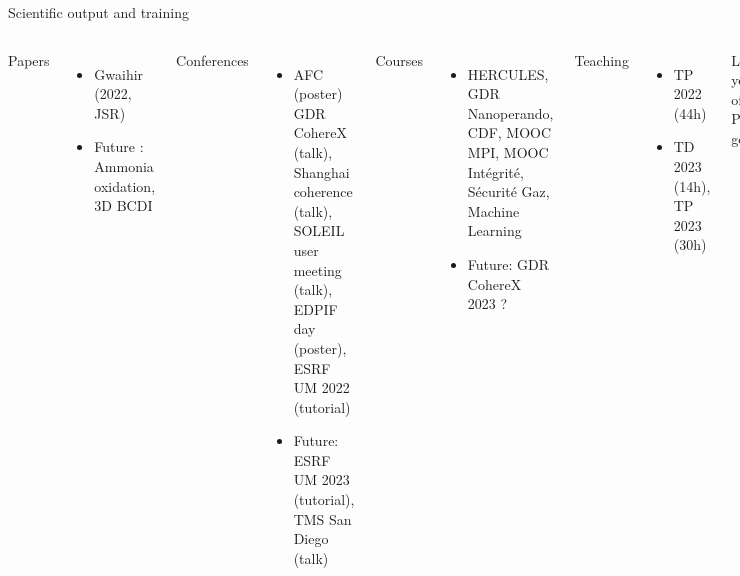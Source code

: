 \begin{frame}{Scientific output and training}
    \begin{columns}

        \textcolor{Prune}{Papers}
        \begin{itemize}
            \item Gwaihir (2022, JSR)
            \item Future : Ammonia oxidation, 3D BCDI
        \end{itemize}

        \pause
        \textcolor{Prune}{Conferences}
        \begin{itemize}
            \item AFC (poster) GDR CohereX (talk), Shanghai coherence (talk), SOLEIL user meeting (talk), EDPIF day (poster), ESRF UM 2022 (tutorial)
            \item Future: ESRF UM 2023 (tutorial), TMS San Diego (talk)
        \end{itemize}

        \pause
        \textcolor{Prune}{Courses}
        \begin{itemize}
            \item HERCULES, GDR Nanoperando, CDF, MOOC MPI, MOOC Intégrité, Sécurité Gaz, Machine Learning
            \item Future:  GDR CohereX 2023 ?
        \end{itemize}
        
        \pause
        \textcolor{Prune}{Teaching}
        \begin{itemize}
            \item TP 2022 (44h)
            \item TD 2023 (14h), TP 2023 (30h)
        \end{itemize}

        
        \pause
        \textcolor{Important}{Last year of Phd goals}
        \begin{itemize}
            \item Finish analysis on Ammonia oxidation
            \item Start thesis writing in June ?
            \item Conference on SXRD ?
        \end{itemize}

        \vspace{1cm}


\end{columns}
\end{frame}
